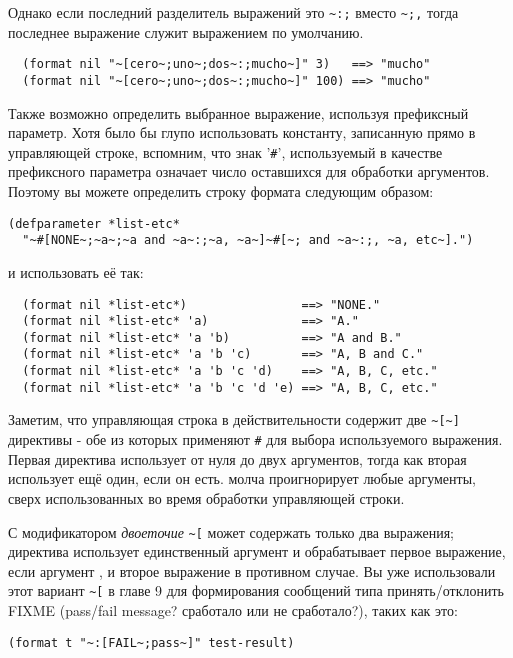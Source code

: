 {Однако если последний разделитель выражений это \lstinline!~:;! вместо \lstinline!~;,!
тогда последнее выражение служит выражением по умолчанию.

\begin{verbatim}
  (format nil "~[cero~;uno~;dos~:;mucho~]" 3)   ==> "mucho"
  (format nil "~[cero~;uno~;dos~:;mucho~]" 100) ==> "mucho"
\end{verbatim}

Также возможно определить выбранное выражение, используя префиксный параметр. Хотя было бы
глупо использовать константу, записанную прямо в управляющей строке, вспомним, что знак
'\lstinline!#!', используемый в качестве префиксного параметра означает число оставшихся
для обработки аргументов. Поэтому вы можете определить строку формата следующим образом:

\begin{lstlisting}
(defparameter *list-etc*
  "~#[NONE~;~a~;~a and ~a~:;~a, ~a~]~#[~; and ~a~:;, ~a, etc~].")
\end{lstlisting}

и использовать её так:

\begin{verbatim}
  (format nil *list-etc*)                ==> "NONE."
  (format nil *list-etc* 'a)             ==> "A."
  (format nil *list-etc* 'a 'b)          ==> "A and B."
  (format nil *list-etc* 'a 'b 'c)       ==> "A, B and C."
  (format nil *list-etc* 'a 'b 'c 'd)    ==> "A, B, C, etc."
  (format nil *list-etc* 'a 'b 'c 'd 'e) ==> "A, B, C, etc."
\end{verbatim}

Заметим, что управляющая строка в действительности содержит две \lstinline!~[~]! директивы
- обе из которых применяют \lstinline!#! для выбора используемого выражения. Первая
директива использует от нуля до двух аргументов, тогда как вторая использует ещё один,
если он есть.  молча проигнорирует любые аргументы, сверх использованных во
время обработки управляющей строки.

С модификатором \textit{двоеточие} \lstinline!~[! может содержать только два выражения;
директива использует единственный аргумент и обрабатывает первое выражение, если аргумент
, и второе выражение в противном случае. Вы уже использовали этот вариант
\lstinline!~[! в главе 9 для формирования сообщений типа принять/отклонить FIXME
(pass/fail message? сработало или не сработало?), таких как это:

\begin{lstlisting}
(format t "~:[FAIL~;pass~]" test-result)
\end{lstlisting}

}
